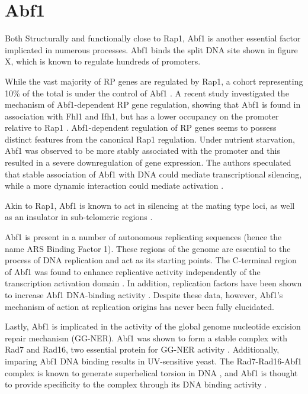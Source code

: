 \section{Abf1}

Both Structurally and functionally close to Rap1, Abf1 is another essential factor implicated in numerous processes. 
Abf1 binds the split DNA site shown in figure X, which is known to regulate hundreds of promoters. 

While the vast majority of RP genes are regulated by Rap1, a cohort representing 10\% of the total is under the control of Abf1 \cite{dellaseta:1990:abf1}. 
A recent study investigated the mechanism of Abf1-dependent RP gene regulation, showing that Abf1 is found in association with Fhl1 and Ifh1, but has a lower occupancy on the promoter relative to Rap1 \cite{fermi:2016:multiple}. 
Abf1-dependent regulation of RP genes seems to possess distinct features from the canonical Rap1 regulation. 
Under nutrient starvation, Abf1 was observed to be more stably associated with the promoter and this resulted in a severe downregulation of gene expression. 
The authors speculated that stable association of Abf1 with DNA could mediate transcriptional silencing, while a more dynamic interaction could mediate activation \cite{fermi:2016:promoter}.

Akin to Rap1, Abf1 is known to act in silencing at the mating type loci, as well as an insulator in sub-telomeric regions \cite{mak:2009:dynamic}. 

Abf1 is present in a number of autonomous replicating sequences (hence the name ARS Binding Factor 1). 
These regions of the genome are essential to the process of DNA replication and act as its starting points.
The C-terminal region of Abf1 was found to enhance replicative activity independently of the transcription activation domain \cite{wiltshire:1997:abf1p}. 
In addition, replication factors have been shown to increase Abf1 DNA-binding activity \cite{feng:1998:saccharomyces}. 
Despite these data, however, Abf1’s mechanism of action at replication origins has never been fully elucidated.

Lastly, Abf1 is implicated in the activity of the global genome nucleotide excision repair mechanism (GG-NER). 
Abf1 was shown to form a stable complex with Rad7 and Rad16, two essential protein for GG-NER activity  \cite{reed:1999:yeast}. 
Additionally, imparing Abf1 DNA binding results in UV-sensitive yeast. 
The Rad7-Rad16-Abf1 complex is known to generate superhelical torsion in DNA \cite{yu:2004:yeast}, and Abf1 is thought to provide specificity to the complex through its DNA binding activity \cite{Yu:2009:abf1binding}.

